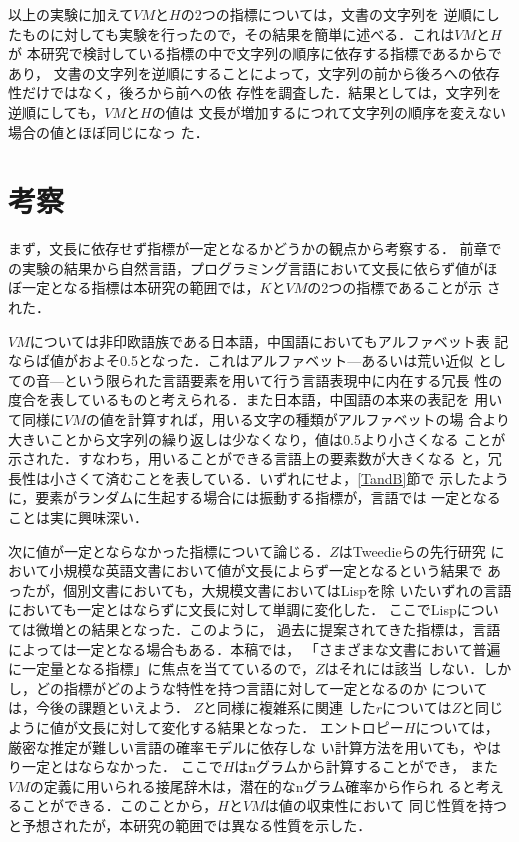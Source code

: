 \documentclass[japanese]{jnlp_JS2.0}
\begin{document}
以上の実験に加えて$\mathit{VM}$と$H$の2つの指標については，文書の文字列を
逆順にしたものに対しても実験を行ったので，その結果を簡単に述べる．これは$\mathit{VM}$と$H$が
本研究で検討している指標の中で文字列の順序に依存する指標であるからであり，
文書の文字列を逆順にすることによって，文字列の前から後ろへの依存性だけではなく，後ろから前への依
存性を調査した．結果としては，文字列を逆順にしても，$\mathit{VM}$と$H$の値は
文長が増加するにつれて文字列の順序を変えない場合の値とほぼ同じになっ
た．



\section{考察}

まず，文長に依存せず指標が一定となるかどうかの観点から考察する． 前章で
の実験の結果から自然言語，プログラミング言語において文長に依らず値がほ
ぼ一定となる指標は本研究の範囲では，$K$と$\mathit{VM}$の2つの指標であることが示
された． 

$\mathit{VM}$については非印欧語族である日本語，中国語においてもアルファベット表
記ならば値がおよそ0.5となった．これはアルファベット—あるいは荒い近似
としての音—という限られた言語要素を用いて行う言語表現中に内在する冗長
性の度合を表しているものと考えられる．また日本語，中国語の本来の表記を
用いて同様に$\mathit{VM}$の値を計算すれば，用いる文字の種類がアルファベットの場
合より大きいことから文字列の繰り返しは少なくなり，値は0.5より小さくなる
ことが示された．すなわち，用いることができる言語上の要素数が大きくなる
と，冗長性は小さくて済むことを表している．いずれにせよ，\ref{TandB}節で
示したように，要素がランダムに生起する場合には振動する指標が，言語では
一定となることは実に興味深い．

次に値が一定とならなかった指標について論じる．$Z$はTweedieらの先行研究
において小規模な英語文書において値が文長によらず一定となるという結果で
あったが，個別文書においても，大規模文書においてはLispを除
いたいずれの言語においても一定とはならずに文長に対して単調に変化した． 
ここでLispについては微増との結果となった．このように，
過去に提案されてきた指標は，言語によっては一定となる場合もある．本稿では，
「さまざまな文書において普遍に一定量となる指標」に焦点を当てているので，$Z$はそれには該当
しない．しかし，どの指標がどのような特性を持つ言語に対して一定となるのか
については，今後の課題といえよう．
$Z$と同様に複雑系に関連
した$r$については$Z$と同じように値が文長に対して変化する結果となった．
エントロピー$H$については，厳密な推定が難しい言語の確率モデルに依存しな
い計算方法を用いても，やはり一定とはならなかった．
ここで$H$はnグラムから計算することができ，
また$\mathit{VM}$の定義に用いられる接尾辞木は，潜在的なnグラム確率から作られ
ると考えることができる．このことから，$H$と$\mathit{VM}$は値の収束性において
同じ性質を持つと予想されたが，本研究の範囲では異なる性質を示した．
\end{document}
